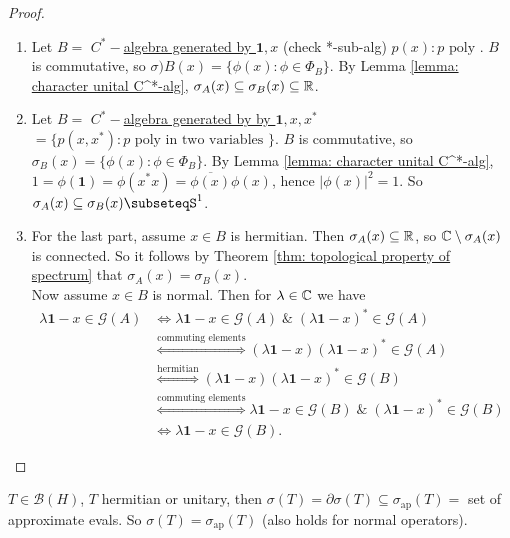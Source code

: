 \documentclass{article}
\begin{document}
\begin{proof}
    \begin{enumerate}[label = (\roman*), align = left]
        \item Let $B=$ \noindent\underline{$C^*-$algebra generated by $\mathbf{1}, x$}  (check *-sub-alg) $p(x): p \text{ poly }$. $B$ is commutative, so $\sigma)B(x) = \{\phi(x):\phi\in \Phi_B\}$. By Lemma \ref{lemma: character unital C^*-alg}, $\sigma_A(x)\subseteq\sigma_B(x)\subseteq\mathbb{R}$.
        \item Let $B=$ \noindent\underline{$C^*-$algebra generated by by $\mathbf{1}, x, x^*$} $=\{p(x,x^*): p \text{ poly in two variables }\}$. $B$ is commutative, so $\sigma_B(x) = \{\phi(x):\phi \in \Phi_B\}$. By Lemma \ref{lemma: character unital C^*-alg}, $1=\phi(\mathbf{1})=\phi(x^*x)=\overline{\phi(x)}\phi(x)$, hence $|\phi(x)|^2 = 1$. So $\sigma_A(x)\subseteq\sigma_B(x)\subseteqS^1$.
        \item For the last part, assume $x\in B$ is hermitian. Then $\sigma_A(x)\subseteq\mathbb{R}$, so $\mathbb{C}\setminus \sigma_A(x)$ is connected. So it follows by Theorem \ref{thm: topological property of spectrum} that $\sigma_A(x) = \sigma_B(x)$.\\

        Now assume $x\in B$ is normal. Then for $\lambda\in \mathbb{C}$ we have 
        $$
        \begin{array}{ll}
            \lambda\mathbf{1}-x \in \mathcal{G}(A) &\iff \lambda\mathbf{1}-x\in \mathcal{G}(A) \;\&\; (\lambda\mathbf{1}-x)^*\in \mathcal{G}(A)\\
            &\stackrel{\text{commuting elements}}{\iff} (\lambda\mathbf{1}-x)(\lambda\mathbf{1}-x)^*\in \mathcal{G}(A)\\
            &\stackrel{\text{hermitian}}{\iff} (\lambda\mathbf{1}-x)(\lambda\mathbf{1}-x)^*\in \mathcal{G}(B)\\
            &\stackrel{\text{commuting elements}}{\iff}\lambda\mathbf{1}-x\in \mathcal{G}(B) \;\&\; (\lambda\mathbf{1}-x)^*\in \mathcal{G}(B)\\
            &\iff \lambda\mathbf{1}-x\in \mathcal{G}(B).
        \end{array}
        $$
    \end{enumerate}
\end{proof}

\begin{remark}
    $T\in \mathcal{B}(H)$, $T$ hermitian or unitary, then $\sigma(T) = \partial\sigma(T)\subseteq \sigma_{\text{ap}}(T)=$ set of approximate evals. So $\sigma(T) = \sigma_{\text{ap}}(T)$ (also holds for normal operators).
\end{remark}
\end{document}
